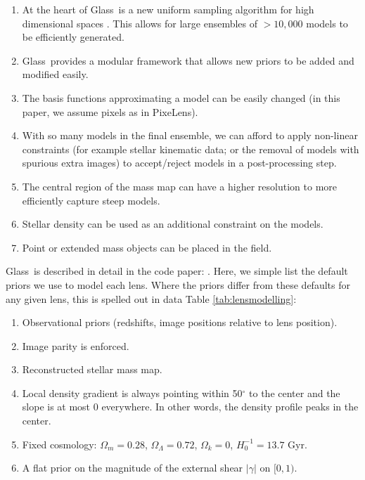 \documentclass[useAMS,usenatbib]{mn2e}
\def\Glass{{\sc Glass}}
\def\PixeLens{{\sc PixeLens}}
\begin{document}
\begin{enumerate}
\item At the heart of \Glass\ is a new uniform sampling algorithm for high
    dimensional spaces \citep{2012MNRAS.425.3077L}. This allows for large
    ensembles of $>10,000$ models to be efficiently generated. 
\item \Glass\ provides a modular framework that allows new priors to be added
    and modified easily.
\item The basis functions approximating a model can be easily changed (in this
    paper, we assume pixels as in \PixeLens). 
\item With so many models in the final ensemble, we can afford to apply
    non-linear constraints (for example stellar kinematic data; or the removal of
    models with spurious extra images) to accept/reject models in a post-processing
    step.
\item The central region of the mass map can have a higher resolution to more
    efficiently capture steep models.
\item Stellar density can be used as an additional constraint on the models. 
\item Point or extended mass objects can be placed in the field.
\end{enumerate} 

\Glass\ is described in detail in the code paper: \citet{2014arXiv1401.7990C}. Here, we simple list the default priors we use to model each lens. Where the priors differ from these defaults for any given lens, this is spelled out in data Table \ref{tab:lensmodelling}: 

\begin{enumerate} 
\item Observational priors (redshifts, image positions relative to lens position).
\item Image parity is enforced.
\item Reconstructed stellar mass map.
\item Local density gradient is always pointing within 50$^{\circ}$ to the center and the slope is at most 0 everywhere. In other words, the density profile peaks in the center.
\item Fixed cosmology: $\Omega_{m} = 0.28$, $\Omega_{\Lambda} = 0.72$, $\Omega_{k} = 0$, $H_{0}^{-1} = 13.7$ Gyr.
\item A flat prior on the magnitude of the external shear $|\gamma|$ on $[0,1)$.
\end{enumerate}
\end{document}
